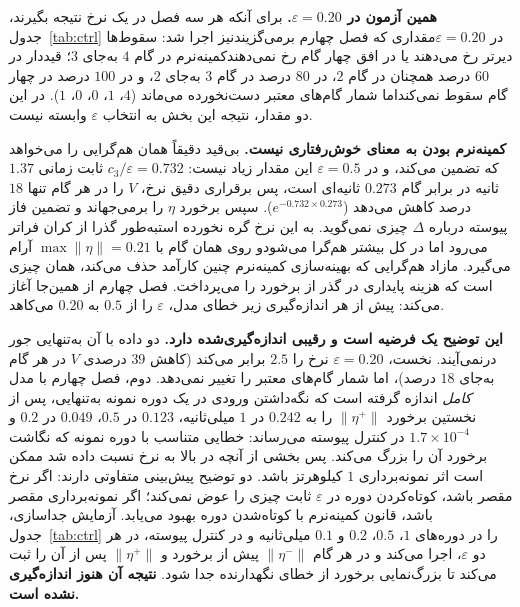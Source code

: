 \documentclass[10pt,twocolumn]{article}
\newcommand{\en}[1]{\lr{#1}}
\newcommand{\md}{\lr{\textemdash}}
\begin{document}
\textbf{همین آزمون در $\varepsilon=0.20$.} برای آنکه هر سه فصل در یک نرخ نتیجه بگیرند،
جدول~\ref{tab:ctrl} در $\varepsilon=0.20$\md{}مقداری که فصل چهارم برمی‌گزیند\md{}نیز اجرا
شد: سقوط‌ها دیرتر رخ می‌دهند یا در افق چهار گام رخ نمی‌دهند\md{}کمینه‌نرم در گام $4$ به‌جای $3$؛ قیددار
در $60$ درصد همچنان در گام $2$، در $80$ درصد در گام $3$ به‌جای $2$، و در $100$ درصد در
چهار گام سقوط نمی‌کند\md{}اما شمار گام‌های معتبر دست‌نخورده می‌ماند ($4$، $1$، $0$، $0$،
$1$). در این دو مقدار، نتیجه این بخش به انتخاب $\varepsilon$ وابسته نیست.

\textbf{کمینه‌نرم بودن به معنای خوش‌رفتاری نیست.} \en{CLF-QP} بی‌قید دقیقاً همان هم‌گرایی را
می‌خواهد که \en{RES-CLF} تضمین می‌کند، و در $\varepsilon=0.5$ این مقدار زیاد نیست:
$c_3/\varepsilon=0.732$ ثابت زمانی $1.37$ ثانیه در برابر گام $0.273$ ثانیه‌ای است، پس برقراری
دقیق نرخ، $V$ را در هر گام تنها $18$ درصد کاهش می‌دهد ($e^{-0.732\times0.273}$). سپس برخورد
$\eta$ را برمی‌جهاند و تضمین فاز پیوسته درباره $\Delta$ چیزی نمی‌گوید. \en{PD} به این نرخ گره
نخورده است\md{}به‌طور گذرا از کران \en{CARE} فراتر می‌رود اما در کل بیشتر هم‌گرا می‌شود\md{}و روی
همان گام با $\max\|\eta\|=0.21$ آرام می‌گیرد. مازاد هم‌گرایی که بهینه‌سازی کمینه‌نرم چنین کارآمد
حذف می‌کند، همان چیزی است که هزینه پایداری در گذر از برخورد را می‌پرداخت. فصل چهارم از همین‌جا
آغاز می‌کند: پیش از هر اندازه‌گیری زیر خطای مدل، $\varepsilon$ را از $0.5$ به $0.20$ می‌کاهد.

\textbf{این توضیح یک فرضیه است و رقیبی اندازه‌گیری‌شده دارد.} دو داده با آن به‌تنهایی جور
درنمی‌آیند. نخست، $\varepsilon=0.20$ نرخ را $2.5$ برابر می‌کند (کاهش $39$ درصدی $V$ در هر
گام به‌جای $18$ درصد)، اما شمار گام‌های معتبر را تغییر نمی‌دهد. دوم، فصل چهارم با مدل
\emph{کامل} اندازه گرفته است که نگه‌داشتن ورودی در یک دوره نمونه به‌تنهایی، پس از نخستین
برخورد $\|\eta^+\|$ را به $0.242$ در $1$ میلی‌ثانیه، $0.123$ در $0.5$، $0.049$ در $0.2$ و
$1.7\times10^{-4}$ در کنترل پیوسته می‌رساند: خطایی متناسب با دوره نمونه که نگاشت برخورد آن
را بزرگ می‌کند. پس بخشی از آنچه در بالا به نرخ نسبت داده شد ممکن است اثر نمونه‌برداری
$1$ کیلوهرتز باشد. دو توضیح پیش‌بینی متفاوتی دارند: اگر نرخ مقصر باشد، کوتاه‌کردن دوره در
$\varepsilon$ ثابت چیزی را عوض نمی‌کند؛ اگر نمونه‌برداری مقصر باشد، قانون کمینه‌نرم با
کوتاه‌شدن دوره بهبود می‌یابد. آزمایش جداسازی، جدول~\ref{tab:ctrl} را در دوره‌های $1$،
$0.5$، $0.2$ و $0.1$ میلی‌ثانیه و در کنترل پیوسته، در هر دو $\varepsilon$، اجرا می‌کند و در هر
گام $\|\eta^-\|$ پیش از برخورد و $\|\eta^+\|$ پس از آن را ثبت می‌کند تا بزرگ‌نمایی برخورد از
خطای نگهدارنده جدا شود. \textbf{نتیجه آن هنوز اندازه‌گیری نشده است.}
\end{document}

